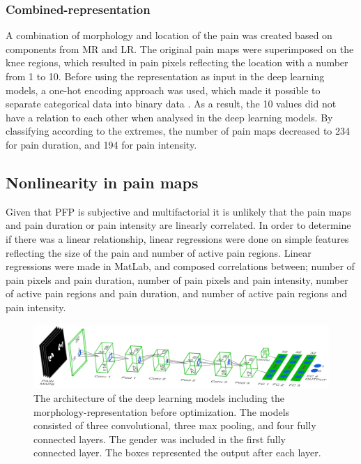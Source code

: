 \subsubsection*{\textbf{Combined-representation}} 
A combination of morphology and location of the pain was created based on components from MR and LR. The original pain maps were superimposed on the knee regions, which resulted in pain pixels reflecting the location with a number from 1 to 10. Before using the representation as input in the deep learning models, a one-hot encoding approach was used, which made it possible to separate categorical data into binary data \citep{Harris2012}. As a result, the 10 values did not have a relation to each other when analysed in the deep learning models. By classifying according to the extremes, the number of pain maps decreased to 234 for pain duration, and 194 for pain intensity.

\subsection*{\textbf{Nonlinearity in pain maps}} 
Given that PFP is subjective and multifactorial it is unlikely that the pain maps and pain duration or pain intensity are linearly correlated. In order to determine if there was a linear relationship, linear regressions were done on simple features reflecting the size of the pain and number of active pain regions. Linear regressions were made in MatLab, and composed correlations between; number of pain pixels and pain duration, number of pain pixels and pain intensity, number of active pain regions and pain duration, and number of active pain regions and pain intensity.

\begin{figure} [t!]
\centering
\includegraphics[width=1\textwidth]{Figures/models}
\caption{The architecture of the deep learning models including the morphology-representation before optimization. The models consisted of three convolutional, three max pooling, and four fully connected layers. The gender was included in the first fully connected layer. The boxes represented the output after each layer.}
\label{fig:models}
\end{figure}

